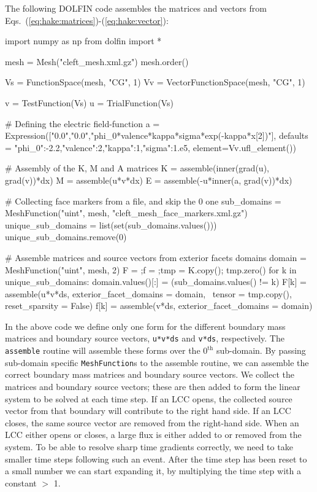 The following DOLFIN code assembles the matrices and vectors from
Eqs.~(\ref{eq:hake:matrices})-(\ref{eq:hake:vector}):
\begin{python}
import numpy as np
from dolfin import *

mesh = Mesh("cleft_mesh.xml.gz")
mesh.order()

Vs = FunctionSpace(mesh, "CG", 1)
Vv = VectorFunctionSpace(mesh, "CG", 1)

v = TestFunction(Vs)
u = TrialFunction(Vs)

# Defining the electric field-function
a = Expression(["0.0","0.0","phi_0*valence*kappa*sigma*exp(-kappa*x[2])"],
               defaults = {"phi_0":-2.2,"valence":2,"kappa":1,"sigma":1.e5},
               element=Vv.ufl_element())

# Assembly of the K, M and A matrices
K = assemble(inner(grad(u), grad(v))*dx)
M = assemble(u*v*dx)
E = assemble(-u*inner(a, grad(v))*dx)

# Collecting face markers from a file, and skip the 0 one
sub_domains = MeshFunction("uint", mesh, "cleft_mesh_face_markers.xml.gz")
unique_sub_domains = list(set(sub_domains.values()))
unique_sub_domains.remove(0)

# Assemble matrices and source vectors from exterior facets domains
domain = MeshFunction("uint", mesh, 2)
F = {};f = {};tmp = K.copy(); tmp.zero()
for k in unique_sub_domains:
    domain.values()[:] = (sub_domains.values() != k)
    F[k] = assemble(u*v*ds, exterior_facet_domains = domain, \
                    tensor = tmp.copy(), reset_sparsity = False)
    f[k] = assemble(v*ds, exterior_facet_domains = domain)
\end{python}
In the above code we define only one form for the different boundary
mass matrices and boundary source vectors, \texttt{u*v*ds} and
\texttt{v*ds}, respectively. The \texttt{assemble} routine will
assemble these forms over the $0^{\scriptscriptstyle\text{th}}$
sub-domain. By passing sub-domain specific \texttt{MeshFunction}s to
the assemble routine, we can assemble the correct boundary mass
matrices and boundary source vectors. We collect the matrices and
boundary source vectors; these are then added to form the linear
system to be solved at each time step. If an LCC opens, the collected
source vector from that boundary will contribute to the right hand
side. If an LCC closes, the same source vector are removed from the
right-hand side. When an LCC either opens or closes, a large flux is
either added to or removed from the system. To be able to resolve
sharp time gradients correctly, we need to take smaller time steps
following such an event. After the time step has been reset to a small
number we can start expanding it, by multiplying the time step with a
constant $>$ 1.

